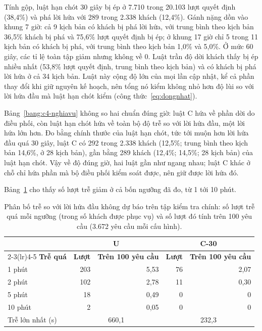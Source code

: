 Tính gộp, luật hạn chót 30 giây bị ép ở 7.710 trong 20.103 lượt quyết định (38,4\%) và phá lời hứa với 289 trong
2.338 khách (12,4\%). Gánh nặng dồn vào khung 7 giờ: cả 9 kịch bản có khách bị phá lời hứa, với trung bình theo kịch
bản 36,5\% khách bị phá và 75,6\% lượt quyết định bị ép; ở khung 17 giờ chỉ 5 trong 11 kịch bản có khách bị phá, với
trung bình theo kịch bản 1,0\% và 5,0\%. Ở mức 60 giây, các tỉ lệ toàn tập giảm nhưng không về 0. Luật trần độ dời
khách thấy bị ép nhiều nhất (53,8\% lượt quyết định, trung bình theo kịch bản) và có khách bị phá lời hứa ở cả 34
kịch bản. Luật này cộng độ lớn của mọi lần cập nhật, kể cả phần thay đổi khi giữ nguyên kế hoạch, nên tổng nó kiểm
không nhỏ hơn độ lùi so với lời hứa đầu mà luật hạn chót kiểm (công thức~\eqref{eq:dongnhat}).

Bảng~\ref{bang:c4-nghiavu} không so hai chuẩn đúng giờ: luật C hứa về phần dời do điều phối, còn luật hạn chót hứa
về toàn bộ độ trễ so với lời hứa đầu, một lời hứa lớn hơn. Đo bằng chính thước của luật hạn chót, tức tới muộn hơn
lời hứa đầu quá 30 giây, luật C có 292 trong 2.338 khách (12,5\%; trung bình theo kịch bản 14,6\%, ở 28 kịch bản),
gần bằng 289 khách (12,4\%; 14,5\%; 28 kịch bản) của luật hạn chót. Vậy về độ đúng giờ, hai luật gần như ngang nhau;
luật C khác ở chỗ chỉ hứa phần mà bộ điều phối kiểm soát được, nên giữ được lời hứa đó.

Bảng~\ref{bang:c4-phanbotre} cho thấy số lượt trễ giảm ở cả bốn ngưỡng đã đo, từ 1 tới 10 phút.

\begin{table}[htbp]
\centering
\caption{Phân bố trễ so với lời hứa đầu không dự báo trên tập kiểm tra chính: số lượt trễ quá mỗi ngưỡng
(trong số khách được phục vụ) và số lượt đó tính trên 100 yêu cầu (3.672 yêu cầu mỗi cấu hình).}
\label{bang:c4-phanbotre}
\small
\begin{tabular}{@{}lrrrr@{}}
\toprule
& \multicolumn{2}{c}{\textbf{U}} & \multicolumn{2}{c}{\textbf{C-30}}\\
\cmidrule(lr){2-3}\cmidrule(lr){4-5}
\textbf{Trễ quá} & \textbf{Lượt} & \textbf{Trên 100 yêu cầu} & \textbf{Lượt} & \textbf{Trên 100 yêu cầu}\\
\midrule
1 phút & 203 & 5,53 & 76 & 2,07\\
2 phút & 102 & 2,78 & 11 & 0,30\\
5 phút & 18 & 0,49 & 0 & 0\\
10 phút & 2 & 0,05 & 0 & 0\\
\midrule
Trễ lớn nhất (s) & \multicolumn{2}{c}{660,1} & \multicolumn{2}{c}{232,3}\\
\bottomrule
\end{tabular}
\end{table}

